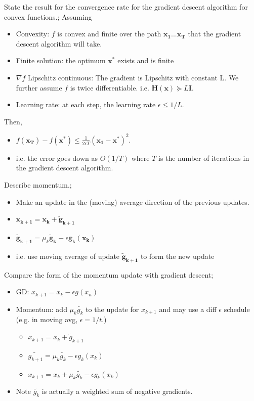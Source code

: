 \documentclass{article}
\begin{document}
State the result for the convergence rate for the gradient descent algorithm for convex functions.; Assuming \begin{itemize} \item Convexity: $f$ is convex and finite over the path $\mathbf{x_1...x_T}$ that the gradient descent algorithm will take.  \item Finite solution: the optimum $\mathbf{x^*}$ exists and is finite \item $\nabla f$ Lipschitz continuous: The gradient is Lipschitz with constant L. We further assume $f$ is twice differentiable. i.e. $\mathbf{H(x)}\succeq L\mathbf{I}$.  \item Learning rate: at each step, the learning rate $\epsilon \leq 1/L$.  \end{itemize} Then, \begin{itemize} \item $f(\mathbf{x_T})-f (\mathbf{x^*})\leq \frac{1}{2\epsilon T}(\mathbf{x_1-x^*})^2$.  \item i.e. the error goes down as $O(1/T)$ where $T$ is the number of iterations in the gradient descent algorithm.  \end{itemize}

Describe momentum.;\begin{itemize} \item Make an update in the (moving) average direction of the previous updates.  \item $\mathbf{x_{k+1}=x_k+\tilde{g}_{k+1}}$ \item $\mathbf{\tilde{g}_{k+1}}=\mu_k\mathbf{\tilde{g}_k}-\epsilon \mathbf{g_k(x_k)}$ \item i.e. use moving average of update $\mathbf{\tilde{g}_{k+1}}$ to form the new update \end{itemize}

Compare the form of the momentum update with gradient descent; \begin{itemize} \item GD: $x_{k+1}=x_k - \epsilon g(x_n)$ \item Momentum: add $\mu_k\tilde{g_k}$ to the update for $x_{k+1}$ and may use a diff $\epsilon$ schedule (e.g. in moving avg, $\epsilon=1/t$.) \begin{itemize} \item $x_{k+1}=x_k+\tilde g_{k+1}$ \item $\tilde{g_{k+1}}=\mu_k\tilde{g_k}-\epsilon g_k(x_k)$ \item $x_{k+1}=x_k+ \mu_k\tilde{g_k}-\epsilon g_k(x_k)$ \end{itemize} \item Note $\tilde{g_k}$ is actually a weighted sum of negative gradients.\end{itemize}
\end{document}
